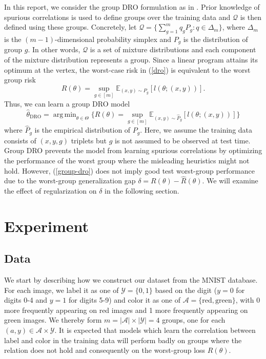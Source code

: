\documentclass{article}
\DeclareMathOperator{\dro}{DRO}
\DeclareMathOperator*{\argmin}{arg\,min}
\begin{document}
In this report, we consider the group DRO formulation as in \cite{groupdro}. Prior knowledge of spurious correlations is used to define groups over the training data and $\mathcal{Q}$ is then defined using these groups. Concretely, let $\mathcal{Q}=\{\sum_{g=1}^mq_gP_g:q\in\Delta_m\}$, where $\Delta_m$  is the $(m-1)$-dimensional probability simplex and $P_g$ is the distribution of group $g$. In other words, $\mathcal{Q}$ is a set of mixture distributions and each component of the mixture distribution represents a group. Since a linear program attains its optimum at the vertex, the worst-case risk in (\ref{dro}) is equivalent to the worst group risk
\begin{equation}
    R(\theta)=\sup_{g\in[m]}\mathbb{E}_{(x,y)\sim P_g}[l(\theta;(x,y))].
\end{equation}
Thus, we can learn a group DRO model
\begin{equation}\label{group-dro}
    \hat{\theta}_{\dro}=\argmin_{\theta\in\Theta}\{\hat{R}(\theta)=\sup_{g\in[m]}\mathbb{E}_{(x,y)\sim \hat{P}_g}[l(\theta;(x,y))]\}
\end{equation}
where $\hat{P}_g$ is the empirical distribution of $P_g$. Here, we assume the training data consists of $(x,y,g)$ triplets but $g$ is not assumed to be observed at test time. Group DRO prevents the model from learning spurious correlations by optimizing the performance of the worst group where the misleading heuristics might not hold. However, (\ref{group-dro}) does not imply good test worst-group performance due to the worst-group generalization gap $\delta=R(\theta)-\hat{R}(\theta)$. We will examine the effect of regularization on $\delta$ in the following section.

\section{Experiment}
\subsection{Data}
We start by describing how we construct our dataset from the MNIST database. For each image, we label it as one of $\mathcal{Y}=\{0,1\}$ based on the digit ($y = 0$ for digits 0-4 and $y = 1$ for digits 5-9) and color it as one of $\mathcal{A}=\{\text{red},\text{green}\}$, with 0 more frequently appearing on red images and 1 more frequently appearing on green images. We thereby form $m=|\mathcal{A}|\times|\mathcal{Y}|=4$ groups, one for each $(a,y)\in\mathcal{A}\times\mathcal{Y}$. It is expected that models which learn the correlation between label and color in the training data will perform badly on groups where the relation does not hold and consequently on the worst-group loss $R(\theta)$.
\end{document}

